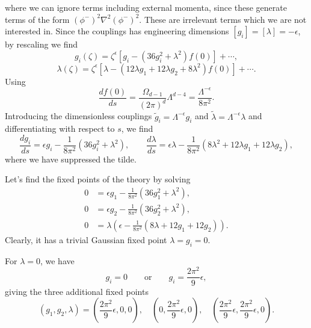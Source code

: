 \begin{solution}
\begin{equation}
\end{equation}
where we can ignore terms including external momenta, since these generate terms of the form $(\phi^-)^2 \nabla^2(\phi^-)^2$. These are irrelevant terms which we are not interested in. Since the couplings has engineering dimensions $[g_i] = [\lambda] = -\epsilon$, by rescaling we find
\begin{equation}
    g_i(\zeta) = \zeta^{\epsilon}[g_i - (36g_i^2 + \lambda^2)f(0)] + \cdots,
\end{equation}
\begin{equation}
    \lambda(\zeta) = \zeta^\epsilon[\lambda - (12\lambda g_1 + 12\lambda g_2 + 8\lambda^2)f(0)] + \cdots.
\end{equation}
Using
\begin{equation}
    \frac{df(0)}{ds} = \frac{\Omega_{d-1}}{(2\pi)^d}\Lambda^{d-4} = \frac{\Lambda^{-\epsilon}}{8\pi^2}.
\end{equation}
Introducing the dimensionless couplings $\tilde g_i = \Lambda^{-\epsilon} g_i$ and $\tilde \lambda = \Lambda^{-\epsilon}\lambda$ and differentiating with respect to $s$, we find
\begin{equation}
    \frac{dg_i}{ds}=\epsilon g_i-\frac{1}{8\pi^2}(36g_i^2+\lambda^2),
    \qquad
    \frac{d\lambda}{ds}
    =\epsilon\lambda-\frac{1}{8\pi^2}(8\lambda^2+12\lambda g_1
    +12\lambda g_2),
\end{equation}
where we have suppressed the tilde.

Let's find the fixed points of the theory by solving
\begin{align}
0 &= \epsilon g_1-\frac{1}{8\pi^2}(36g_1^2+\lambda^2),\\
0 &= \epsilon g_2-\frac{1}{8\pi^2}(36g_2^2+\lambda^2),\\
0 &= \lambda\left(\epsilon-\frac{1}{8\pi^2}
(8\lambda+12g_1+12g_2)\right).
\end{align}
Clearly, it has a trivial Gaussian fixed point $\lambda=g_i=0$.

For $\lambda=0$, we have
\begin{equation}
g_i=0
\qquad \mathrm{or} \qquad
g_i=\frac{2\pi^2}{9}\epsilon,
\end{equation}
giving the three additional fixed points
\begin{equation}
(g_1,g_2,\lambda)
=
\left(\frac{2\pi^2}{9}\epsilon,0,0\right),
\quad
\left(0,\frac{2\pi^2}{9}\epsilon,0\right),
\quad
\left(\frac{2\pi^2}{9}\epsilon,
\frac{2\pi^2}{9}\epsilon,0\right).
\end{equation}


\end{solution}

